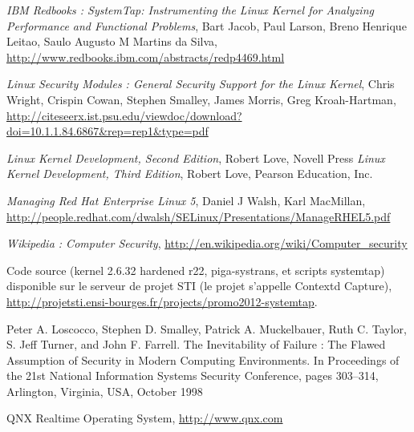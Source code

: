 \documentclass[pdftex,a4paper,titlepage,11pt]{article}
\begin{document}
\begin{thebibliography}{40}

 \textit{IBM Redbooks : SystemTap: Instrumenting the Linux Kernel for Analyzing Performance and Functional Problems}, Bart Jacob, Paul Larson, Breno Henrique Leitao, Saulo Augusto M Martins da Silva, \url{http://www.redbooks.ibm.com/abstracts/redp4469.html}

 \textit{Linux Security Modules : General Security Support for the Linux Kernel}, Chris Wright, Crispin Cowan, Stephen Smalley, James Morris, Greg Kroah-Hartman, \url{http://citeseerx.ist.psu.edu/viewdoc/download?doi=10.1.1.84.6867&rep=rep1&type=pdf}

 \textit{Linux Kernel Development, Second Edition}, Robert Love, Novell Press
 \textit{Linux Kernel Development, Third Edition}, Robert Love, Pearson Education, Inc.

 \textit{Managing Red Hat Enterprise Linux 5}, Daniel J Walsh, Karl MacMillan, \url{http://people.redhat.com/dwalsh/SELinux/Presentations/ManageRHEL5.pdf}

 \textit{Wikipedia : Computer Security}, \url{http://en.wikipedia.org/wiki/Computer_security}

 Code source (kernel 2.6.32 hardened r22, piga-systrans, et scripts systemtap) disponible sur le serveur de projet STI (le projet s'appelle Contextd Capture), \url{http://projetsti.ensi-bourges.fr/projects/promo2012-systemtap}.

 Peter A. Loscocco, Stephen D. Smalley, Patrick A. Muckelbauer, Ruth C. Taylor, S. Jeff Turner, and John F. Farrell. The Inevitability of Failure : The Flawed Assumption of Security in Modern Computing Environments. In Proceedings of the 21st National Information Systems Security Conference, pages 303–314, Arlington, Virginia, USA, October 1998


 QNX Realtime Operating System, \url{http://www.qnx.com}

\end{thebibliography}

\end{document}
